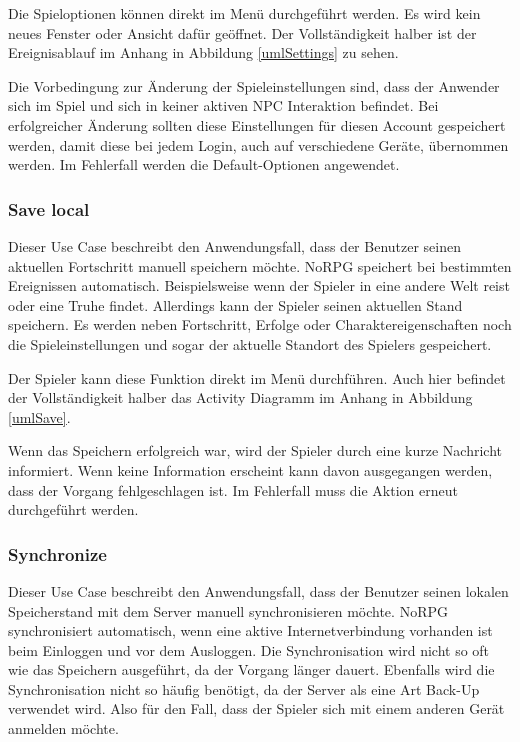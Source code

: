 			Die Spieloptionen können direkt im Menü durchgeführt werden. Es wird kein neues Fenster oder Ansicht dafür geöffnet. Der Vollständigkeit halber ist der Ereignisablauf im Anhang in Abbildung \ref{umlSettings} zu sehen.
	
			Die Vorbedingung zur Änderung der Spieleinstellungen sind, dass der Anwender sich im Spiel und sich in keiner aktiven NPC Interaktion befindet. Bei erfolgreicher Änderung sollten diese Einstellungen für diesen Account gespeichert werden, damit diese bei jedem Login, auch auf verschiedene Geräte, übernommen werden. Im Fehlerfall werden die Default-Optionen angewendet. 
	
		\subsubsection{Save local}
			Dieser Use Case beschreibt den Anwendungsfall, dass der Benutzer seinen aktuellen Fortschritt manuell speichern möchte. NoRPG speichert bei bestimmten Ereignissen automatisch. Beispielsweise wenn der Spieler in eine andere Welt reist oder eine Truhe findet. Allerdings kann der Spieler seinen aktuellen Stand speichern. Es werden neben Fortschritt, Erfolge oder Charaktereigenschaften noch die Spieleinstellungen und sogar der aktuelle Standort des Spielers gespeichert.
			
			Der Spieler kann diese Funktion direkt im Menü durchführen. Auch hier befindet der Vollständigkeit halber das Activity Diagramm im Anhang in Abbildung \ref{umlSave}.
		
			Wenn das Speichern erfolgreich war, wird der Spieler durch eine kurze Nachricht informiert. Wenn keine Information erscheint kann davon ausgegangen werden, dass der Vorgang fehlgeschlagen ist. Im Fehlerfall muss die Aktion erneut durchgeführt werden.
		
		\subsubsection{Synchronize}
			Dieser Use Case beschreibt den Anwendungsfall, dass der Benutzer seinen lokalen Speicherstand mit dem Server manuell synchronisieren möchte. NoRPG synchronisiert automatisch, wenn eine aktive Internetverbindung vorhanden ist beim Einloggen und vor dem Ausloggen. Die Synchronisation wird nicht so oft wie das Speichern ausgeführt, da der Vorgang länger dauert. Ebenfalls wird die Synchronisation nicht so häufig benötigt, da der Server als eine Art Back-Up verwendet wird. Also für den Fall, dass der Spieler sich mit einem anderen Gerät anmelden möchte.
			

